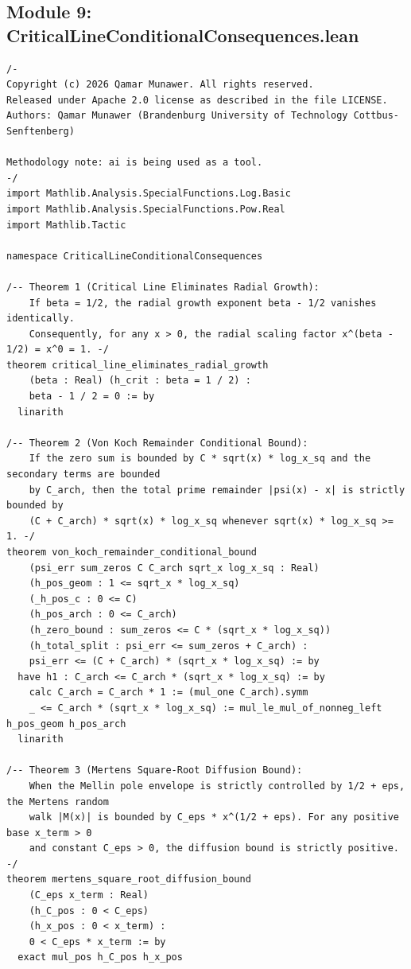 \documentclass[11pt,a4paper]{article}
\begin{document}
\subsection{Module 9: CriticalLineConditionalConsequences.lean}
\begin{lstlisting}[language=Lean4]
/-
Copyright (c) 2026 Qamar Munawer. All rights reserved.
Released under Apache 2.0 license as described in the file LICENSE.
Authors: Qamar Munawer (Brandenburg University of Technology Cottbus-Senftenberg)

Methodology note: ai is being used as a tool.
-/
import Mathlib.Analysis.SpecialFunctions.Log.Basic
import Mathlib.Analysis.SpecialFunctions.Pow.Real
import Mathlib.Tactic

namespace CriticalLineConditionalConsequences

/-- Theorem 1 (Critical Line Eliminates Radial Growth):
    If beta = 1/2, the radial growth exponent beta - 1/2 vanishes identically.
    Consequently, for any x > 0, the radial scaling factor x^(beta - 1/2) = x^0 = 1. -/
theorem critical_line_eliminates_radial_growth
    (beta : Real) (h_crit : beta = 1 / 2) :
    beta - 1 / 2 = 0 := by
  linarith

/-- Theorem 2 (Von Koch Remainder Conditional Bound):
    If the zero sum is bounded by C * sqrt(x) * log_x_sq and the secondary terms are bounded
    by C_arch, then the total prime remainder |psi(x) - x| is strictly bounded by
    (C + C_arch) * sqrt(x) * log_x_sq whenever sqrt(x) * log_x_sq >= 1. -/
theorem von_koch_remainder_conditional_bound
    (psi_err sum_zeros C C_arch sqrt_x log_x_sq : Real)
    (h_pos_geom : 1 <= sqrt_x * log_x_sq)
    (_h_pos_c : 0 <= C)
    (h_pos_arch : 0 <= C_arch)
    (h_zero_bound : sum_zeros <= C * (sqrt_x * log_x_sq))
    (h_total_split : psi_err <= sum_zeros + C_arch) :
    psi_err <= (C + C_arch) * (sqrt_x * log_x_sq) := by
  have h1 : C_arch <= C_arch * (sqrt_x * log_x_sq) := by
    calc C_arch = C_arch * 1 := (mul_one C_arch).symm
    _ <= C_arch * (sqrt_x * log_x_sq) := mul_le_mul_of_nonneg_left h_pos_geom h_pos_arch
  linarith

/-- Theorem 3 (Mertens Square-Root Diffusion Bound):
    When the Mellin pole envelope is strictly controlled by 1/2 + eps, the Mertens random
    walk |M(x)| is bounded by C_eps * x^(1/2 + eps). For any positive base x_term > 0
    and constant C_eps > 0, the diffusion bound is strictly positive. -/
theorem mertens_square_root_diffusion_bound
    (C_eps x_term : Real)
    (h_C_pos : 0 < C_eps)
    (h_x_pos : 0 < x_term) :
    0 < C_eps * x_term := by
  exact mul_pos h_C_pos h_x_pos


\end{lstlisting}
\end{document}
